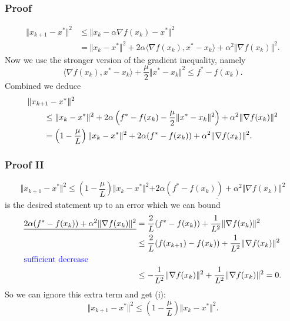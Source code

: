 \documentclass{beamer}
\begin{document}
\begin{frame}
  \frametitle{Proof}
  \begin{equation}
    \begin{aligned}
      \Vert x_{k+1} - x^* \Vert^2 &\le \Vert x_k - \alpha \nabla f(x_k) - x^* \Vert^2 \\
      &= \Vert x_k-x^* \Vert^2 + 2 \alpha \langle \nabla f(x_k), x^*-x_k \rangle + \alpha^2 \Vert \nabla f(x_k) \Vert^2.
    \end{aligned}
  \end{equation}
  Now we use the stronger version of the gradient inequality, namely
  \begin{equation}
    \langle \nabla f(x_k), x^*-x_k \rangle + \frac{\mu}{2} \Vert x^*-x_k \Vert^2 \le f^* -f(x_k).
  \end{equation}
  Combined we deduce
  \begin{equation}
    \begin{aligned}
      \MoveEqLeft \Vert x_{k+1} - x^* \Vert^2 \\
      &\le \Vert x_k-x^* \Vert^2 + 2 \alpha \left(f^* -f(x_k) - \frac{\mu}{2} \Vert x^*-x_k \Vert^2 \right) + \alpha^2 \Vert \nabla f(x_k) \Vert^2\\
      &= \left(1-\frac{\mu}{L}\right)\Vert x_k-x^* \Vert^2 + 2 \alpha (f^* -f(x_k) ) + \alpha^2 \Vert \nabla f(x_k) \Vert^2.
    \end{aligned}
  \end{equation}

\end{frame}

\begin{frame}
  \frametitle{Proof II}
  \vspace{-0.5cm}
  \begin{adjustwidth}{-1em}{-1em}


  \begin{equation}
      \Vert x_{k+1} - x^* \Vert^2 \le \left(1-\frac{\mu}{L}\right)\Vert x_k-x^* \Vert^2 \underline{+ 2 \alpha (f^* -f(x_k) ) + \alpha^2 \Vert \nabla f(x_k) \Vert^2}
  \end{equation}
  is the desired statement up to an error which we can bound
  \begin{align}
    \underline{2 \alpha (f^* -f(x_k) ) + \alpha^2 \Vert \nabla f(x_k) \Vert^2} &= \frac{2}{L} (f^* -f(x_k) ) + \frac{1}{L^2} \Vert \nabla f(x_k) \Vert^2 \\
    &\le \frac{2}{L} (f(x_{k+1}) -f(x_k) ) + \frac{1}{L^2} \Vert \nabla f(x_k) \Vert^2 \\
    \intertext{\textcolor{blue}{sufficient decrease}}
    &\le -\frac{1}{L^2} \Vert \nabla f(x_k) \Vert^2 + \frac{1}{L^2} \Vert \nabla f(x_k) \Vert^2 =0.
  \end{align}
  So we can ignore this extra term and get (i):
  \begin{equation}
    \Vert x_{k+1}-x^* \Vert^2 \le \left(1-\frac{\mu}{L}\right) \Vert x_k -x^* \Vert^2.
  \end{equation}

  \end{adjustwidth}
\end{frame}
\end{document}
